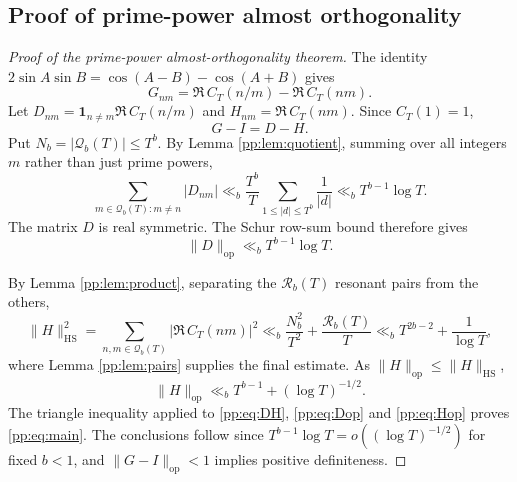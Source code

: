 \documentclass[11pt,reqno]{amsart}
\numberwithin{equation}{section}
\begin{document}
\subsection{Proof of prime-power almost orthogonality}
\begin{proof}[Proof of the prime-power almost-orthogonality theorem]
The identity $2\sin A\sin B=\cos(A-B)-\cos(A+B)$ gives
\begin{equation}
G_{nm}=\Re\,C_T(n/m)-\Re\,C_T(nm).
\label{pp:eq:decomp}
\end{equation}
Let $D_{nm}=\mathbf1_{n\ne m}\Re\,C_T(n/m)$ and $H_{nm}=\Re\,C_T(nm)$. Since $C_T(1)=1$,
\begin{equation}
G-I=D-H.
\label{pp:eq:DH}
\end{equation}
Put $N_b=|\mathcal Q_b(T)|\le T^b$. By Lemma \ref{pp:lem:quotient}, summing over all integers $m$ rather than just prime powers,
\begin{equation}
\sum_{m\in\mathcal Q_b(T):m\ne n}|D_{nm}|
\ll_b \frac{T^b}{T}\sum_{1\le |d|\le T^b}\frac1{|d|}
\ll_b T^{b-1}\log T.
\label{pp:eq:rows}
\end{equation}
The matrix $D$ is real symmetric. The Schur row-sum bound therefore gives
\begin{equation}
\|D\|_{\mathrm{op}}\ll_b T^{b-1}\log T.
\label{pp:eq:Dop}
\end{equation}

By Lemma \ref{pp:lem:product}, separating the $\mathcal R_b(T)$ resonant pairs from the others,
\begin{equation}
\|H\|_{\mathrm{HS}}^2=\sum_{n,m\in\mathcal Q_b(T)}|\Re\,C_T(nm)|^2
\ll_b \frac{N_b^2}{T^2}+\frac{\mathcal R_b(T)}{T}
\ll_b T^{2b-2}+\frac1{\log T},
\label{pp:eq:HHS}
\end{equation}
where Lemma \ref{pp:lem:pairs} supplies the final estimate. As $\|H\|_{\mathrm{op}}\le\|H\|_{\mathrm{HS}}$,
\begin{equation}
\|H\|_{\mathrm{op}}\ll_b T^{b-1}+(\log T)^{-1/2}.
\label{pp:eq:Hop}
\end{equation}
The triangle inequality applied to \eqref{pp:eq:DH}, \eqref{pp:eq:Dop} and \eqref{pp:eq:Hop} proves \eqref{pp:eq:main}. The conclusions follow since $T^{b-1}\log T=o((\log T)^{-1/2})$ for fixed $b<1$, and $\|G-I\|_{\mathrm{op}}<1$ implies positive definiteness.
\end{proof}
\end{document}
